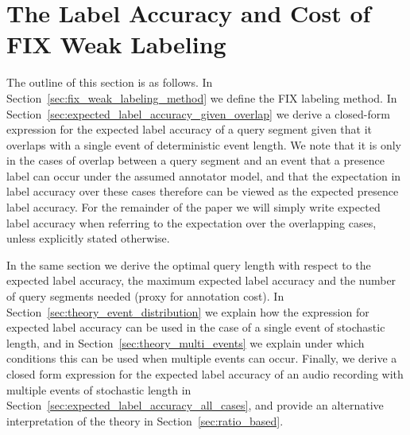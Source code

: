 \section{The Label Accuracy and Cost of FIX Weak Labeling}

The outline of this section is as follows. In Section~\ref{sec:fix_weak_labeling_method} we define the FIX labeling method. In Section~\ref{sec:expected_label_accuracy_given_overlap} we derive a closed-form expression for the expected label accuracy of a query segment given that it overlaps with a single event of deterministic event length. We note that it is only in the cases of overlap between a query segment and an event that a presence label can occur under the assumed annotator model, and that the expectation in label accuracy over these cases therefore can be viewed as the expected presence label accuracy. For the remainder of the paper we will simply write expected label accuracy when referring to the expectation over the overlapping cases, unless explicitly stated otherwise.

In the same section we derive the optimal query length with respect to the expected label accuracy, the maximum expected label accuracy and the number of query segments needed (proxy for annotation cost). In Section~\ref{sec:theory_event_distribution} we explain how the expression for expected label accuracy can be used in the case of a single event of stochastic length, and in Section~\ref{sec:theory_multi_events} we explain under which conditions this can be used when multiple events can occur. Finally, we derive a closed form expression for the expected label accuracy of an audio recording with multiple events of stochastic length in Section~\ref{sec:expected_label_accuracy_all_cases}, and provide an alternative interpretation of the theory in Section~\ref{sec:ratio_based}.



